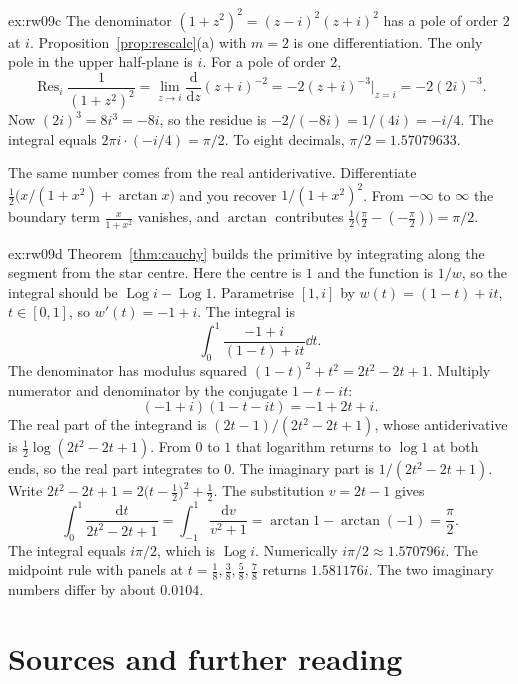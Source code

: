 \begin{solution}{ex:rw09c}
\idea The denominator $(1+z^2)^2=(z-i)^2(z+i)^2$ has a pole of order $2$ at $i$. Proposition~\ref{prop:rescalc}(a) with $m=2$ is one differentiation.
\writeup The only pole in the upper half-plane is $i$. For a pole of order $2$,
\[
\operatorname{Res}_i\frac1{(1+z^2)^2}=\lim_{z\to i}\frac{\mathrm d}{\mathrm dz}(z+i)^{-2}=-2(z+i)^{-3}\Big|_{z=i}=-2(2i)^{-3}.
\]
Now $(2i)^3=8i^3=-8i$, so the residue is $-2/(-8i)=1/(4i)=-i/4$. The integral equals $2\pi i\cdot(-i/4)=\pi/2$. To eight decimals, $\pi/2=1.57079633$.

The same number comes from the real antiderivative. Differentiate $\frac12\bigl(x/(1+x^2)+\arctan x\bigr)$ and you recover $1/(1+x^2)^2$. From $-\infty$ to $\infty$ the boundary term $\frac x{1+x^2}$ vanishes, and $\arctan$ contributes $\frac12\bigl(\frac\pi2-(-\frac\pi2)\bigr)=\pi/2$.
\end{solution}

\begin{solution}{ex:rw09d}
\idea Theorem~\ref{thm:cauchy} builds the primitive by integrating along the segment from the star centre. Here the centre is $1$ and the function is $1/w$, so the integral should be $\operatorname{Log} i-\operatorname{Log} 1$.
\writeup Parametrise $[1,i]$ by $w(t)=(1-t)+it$, $t\in[0,1]$, so $w'(t)=-1+i$. The integral is
\[
\int_0^1\frac{-1+i}{(1-t)+it}\dd t.
\]
The denominator has modulus squared $(1-t)^2+t^2=2t^2-2t+1$. Multiply numerator and denominator by the conjugate $1-t-it$:
\[
(-1+i)(1-t-it)=-1+2t+i.
\]
The real part of the integrand is $(2t-1)/(2t^2-2t+1)$, whose antiderivative is $\frac12\log(2t^2-2t+1)$. From $0$ to $1$ that logarithm returns to $\log1$ at both ends, so the real part integrates to $0$. The imaginary part is $1/(2t^2-2t+1)$. Write $2t^2-2t+1=2\bigl(t-\frac12\bigr)^2+\frac12$. The substitution $v=2t-1$ gives
\[
\int_0^1\frac{\mathrm dt}{2t^2-2t+1}=\int_{-1}^{1}\frac{\mathrm dv}{v^2+1}=\arctan1-\arctan(-1)=\frac\pi2.
\]
The integral equals $i\pi/2$, which is $\operatorname{Log} i$. Numerically $i\pi/2\approx1.570796i$. The midpoint rule with panels at $t=\frac18,\frac38,\frac58,\frac78$ returns $1.581176i$. The two imaginary numbers differ by about $0.0104$.
\end{solution}

\section*{Sources and further reading}

